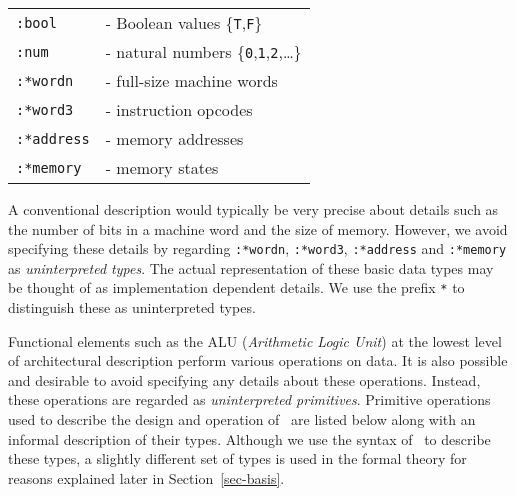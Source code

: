 \begin{center}
\begin{tabular}{ll}
\verb":bool"& - Boolean values \{\verb"T",\verb"F"\}\\
\verb":num"& - natural numbers \{\verb"0",\verb"1",\verb"2",\ldots\}\\
\verb":*wordn"& - full-size machine words\\
\verb":*word3"& - instruction opcodes\\
\verb":*address"& - memory addresses\\
\verb":*memory"& - memory states
\end{tabular}
\end{center}

A conventional description would typically be very precise
about details such as the number of bits in a machine word
and the size of memory.
However, we avoid specifying these details by regarding
\verb":*wordn", \verb":*word3", \verb":*address" and \verb":*memory"
as {\it uninterpreted types}.
The actual representation of these basic data types
may be thought of as implementation dependent details.
We use the prefix \verb"*" to distinguish these as uninterpreted types.

Functional elements such as the ALU
({\it Arithmetic Logic Unit})
at the lowest level of architectural
description perform various operations on data.
It is also possible and desirable to
avoid specifying any details about these operations.
Instead, these operations are
regarded as {\it uninterpreted primitives}.
Primitive operations used to describe the design and operation of
\Tamarack\ are listed below
along with an informal description of their types.
Although we use the syntax of \HOL\ to describe these types,
a slightly different set of types is used in the formal theory
for reasons explained later in Section~\ref{sec-basis}.

